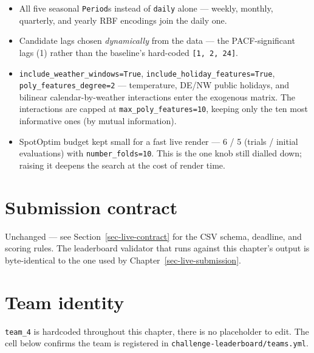 \documentclass[
  english,
  letterpaper,
]{scrbook}
\providecommand{\tightlist}{%
  \setlength{\itemsep}{0pt}\setlength{\parskip}{0pt}}
\begin{document}
\begin{itemize}
\tightlist
\item
  All five seasonal \texttt{Period}s instead of \texttt{daily} alone ---
  weekly, monthly, quarterly, and yearly RBF encodings join the daily
  one.
\item
  Candidate lags chosen \emph{dynamically} from the data --- the
  PACF-significant lags (1) rather than the baseline's hard-coded
  \texttt{{[}1,\ 2,\ 24{]}}.
\item
  \texttt{include\_weather\_windows=True},
  \texttt{include\_holiday\_features=True},
  \texttt{poly\_features\_degree=2} --- temperature, DE/NW public
  holidays, and bilinear calendar-by-weather interactions enter the
  exogenous matrix. The interactions are capped at
  \texttt{max\_poly\_features=10}, keeping only the ten most informative
  ones (by mutual information).
\item
  SpotOptim budget kept small for a fast live render --- 6 / 5 (trials /
  initial evaluations) with \texttt{number\_folds=10}. This is the one
  knob still dialled down; raising it deepens the search at the cost of
  render time.
\end{itemize}

\section{Submission contract}\label{submission-contract}

Unchanged --- see Section~\ref{sec-live-contract} for the CSV schema,
deadline, and scoring rules. The leaderboard validator that runs against
this chapter's output is byte-identical to the one used by
Chapter~\ref{sec-live-submission}.

\section{Team identity}\label{sec-team4-identity}

\texttt{team\_4} is hardcoded throughout this chapter, there is no
placeholder to edit. The cell below confirms the team is registered in
\texttt{challenge-leaderboard/teams.yml}.
\end{document}
